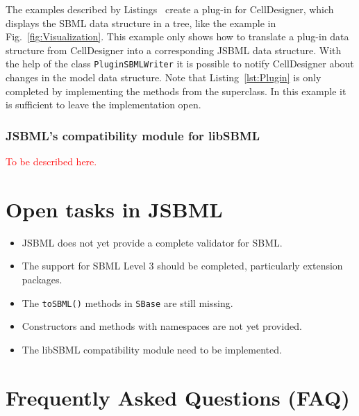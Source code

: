 \documentclass[
  BCOR12mm,
  letterpaper,
  11pt,
  headsepline,
  pointlessnumbers,
  tablecaptionabove,
  onelinecaption,
  headinclude,
  appendixprefix,
  idxtotoc,
  bibtotoc,
  twoside,
  titlepage
]{scrartcl}
\begin{document}
The examples described by Listings~
create a plug-in for CellDesigner, which displays the SBML data structure
in a tree, like the example in Fig.~\vref{fig:Visualization}. This example only
shows how to translate a plug-in data structure
from CellDesigner into a corresponding JSBML data structure. With the help of
the class \texttt{PluginSBMLWriter} it is possible to notify CellDesigner about
changes in the model data structure. Note that Listing~\vref{lst:Plugin} is only
completed by implementing the methods from the superclass. In this example it
is sufficient to leave the implementation open.


\subsubsection{JSBML's compatibility module for libSBML}

\textcolor{red}{To be described here.}


\section{Open tasks in JSBML}

\begin{itemize}
\item JSBML does not yet provide a complete validator for SBML.
\item The support for SBML Level 3 should be completed, particularly extension packages.
\item The \texttt{toSBML()}
methods in \texttt{SBase} are still missing.
\item Constructors and methods with namespaces are not yet provided.
\item The libSBML compatibility module need
to be implemented.
\end{itemize}

\appendix

\section{Frequently Asked Questions (FAQ)}
\end{document}
